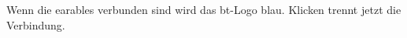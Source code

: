 \documentclass[../pflichtenheft.tex]{subfiles}
\begin{document}
\begin{Parallel}[c]{0.4\textwidth}{0.4\textwidth}
{				
				Wenn die \Gls{earable}s verbunden sind wird das \Gls{bt}-Logo blau. Klicken trennt jetzt die Verbindung.
			}
		\end{Parallel}
		\vspace{10mm}
\end{document}
